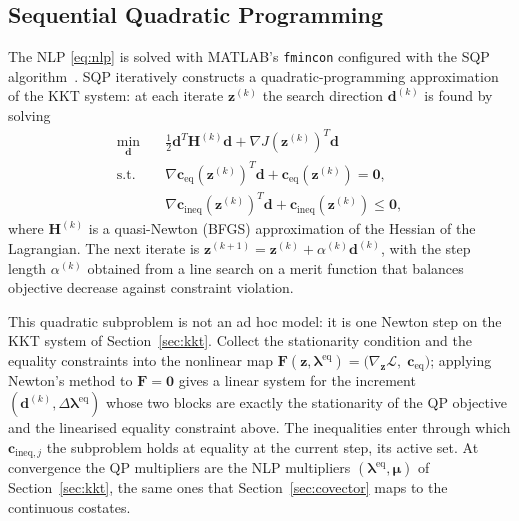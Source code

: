 \documentclass[../main.tex]{subfiles}
\begin{document}
\subsection{Sequential Quadratic Programming}\label{sec:sqp}

The NLP \eqref{eq:nlp} is solved with MATLAB's \texttt{fmincon} configured with the SQP algorithm~\cite[Ch.~1]{betts2010}. SQP iteratively constructs a quadratic-programming approximation of the KKT system: at each iterate $\mathbf{z}^{(k)}$ the search direction $\mathbf{d}^{(k)}$ is found by solving
\begin{equation}
\begin{aligned}
    \min_{\mathbf{d}} \quad & \tfrac{1}{2}\mathbf{d}^T \mathbf{H}^{(k)} \mathbf{d} + \nabla J(\mathbf{z}^{(k)})^T \mathbf{d} \\[2pt]
    \text{s.t.}\quad
    & \nabla \mathbf{c}_{\mathrm{eq}}(\mathbf{z}^{(k)})^T \mathbf{d} + \mathbf{c}_{\mathrm{eq}}(\mathbf{z}^{(k)}) = \mathbf{0}, \\
    & \nabla \mathbf{c}_{\mathrm{ineq}}(\mathbf{z}^{(k)})^T \mathbf{d} + \mathbf{c}_{\mathrm{ineq}}(\mathbf{z}^{(k)}) \leq \mathbf{0},
\end{aligned}
\end{equation}
where $\mathbf{H}^{(k)}$ is a quasi-Newton (BFGS) approximation of the Hessian of the Lagrangian. The next iterate is $\mathbf{z}^{(k+1)} = \mathbf{z}^{(k)} + \alpha^{(k)} \mathbf{d}^{(k)}$, with the step length $\alpha^{(k)}$ obtained from a line search on a merit function that balances objective decrease against constraint violation.

This quadratic subproblem is not an ad hoc model: it is one Newton step on the KKT system of Section~\ref{sec:kkt}. Collect the stationarity condition and the equality constraints into the nonlinear map $\mathbf{F}(\mathbf{z},\boldsymbol{\lambda}^{\mathrm{eq}}) = \bigl(\nabla_{\mathbf{z}}\mathcal{L},\; \mathbf{c}_{\mathrm{eq}}\bigr)$; applying Newton's method to $\mathbf{F} = \mathbf{0}$ gives a linear system for the increment $(\mathbf{d}^{(k)},\Delta\boldsymbol{\lambda}^{\mathrm{eq}})$ whose two blocks are exactly the stationarity of the QP objective and the linearised equality constraint above. The inequalities enter through which $\mathbf{c}_{\mathrm{ineq},j}$ the subproblem holds at equality at the current step, its active set. At convergence the QP multipliers are the NLP multipliers $(\boldsymbol{\lambda}^{\mathrm{eq}},\boldsymbol{\mu})$ of Section~\ref{sec:kkt}, the same ones that Section~\ref{sec:covector} maps to the continuous costates.
\end{document}

